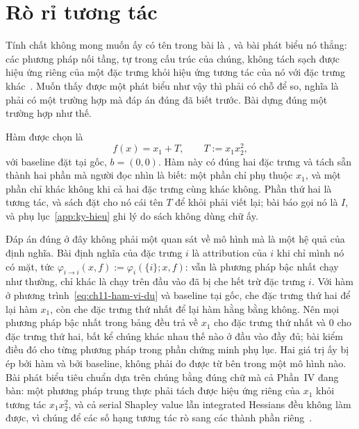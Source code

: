 \section{Rò rỉ tương tác}
\label{sec:ch11-ro-ri-tuong-tac}

%
Tính chất không mong muốn ấy có tên trong bài là
, và bài phát biểu nó thẳng: các
phương pháp nối tầng, tự trong cấu trúc của chúng, không tách sạch được hiệu
ứng riêng của một đặc trưng khỏi hiệu ứng tương tác của nó với đặc trưng
khác~\autocite{p23metagame}. Muốn thấy được một phát biểu như vậy thì phải có
chỗ để so, nghĩa là phải có một trường hợp mà đáp án đúng đã biết trước. Bài
dựng đúng một trường hợp như thế.

Hàm được chọn là
%
\begin{equation}
  \label{eq:ch11-ham-vi-du}
  f(x) = x_1 + T, \qquad T := x_1 x_2^2,
\end{equation}
%
với baseline đặt tại gốc, $b = (0,0)$. Hàm này có đúng hai đặc trưng và tách
sẵn thành hai phần mà người đọc nhìn là biết: một phần chỉ phụ thuộc $x_1$, và
một phần chỉ khác không khi cả hai đặc trưng cùng khác không. Phần thứ hai là
tương tác, và sách đặt cho nó cái tên $T$ để khỏi phải viết lại; bài báo gọi nó
là $I$, và phụ lục~\ref{app:ky-hieu} ghi lý do sách không dùng chữ ấy.

Đáp án đúng ở đây không phải một quan sát về mô hình mà là một hệ quả của định
nghĩa. Bài định nghĩa  của đặc trưng
$i$ là attribution của $i$ khi chỉ mình nó có mặt, tức
$\varphi_{i \to i}(x,f) := \varphi_i(\{i\}; x, f)$: vẫn là phương pháp bậc nhất
chạy như thường, chỉ khác là chạy trên đầu vào đã bị che hết trừ đặc trưng $i$.
Với hàm ở phương trình~\ref{eq:ch11-ham-vi-du} và baseline tại gốc, che đặc
trưng thứ hai để lại hàm $x_1$, còn che đặc trưng thứ nhất để lại hàm hằng
bằng không. Nên mọi phương pháp bậc nhất trong bảng đều trả về $x_1$ cho đặc
trưng thứ nhất và $0$ cho đặc trưng thứ hai, bất kể chúng khác nhau thế nào ở
đầu vào đầy đủ; bài kiểm điều đó cho từng phương pháp trong phần chứng minh
phụ lục. Hai giá trị ấy bị ép bởi hàm và bởi baseline, không phải đo được từ
bên trong một mô hình nào. Bài phát biểu tiêu chuẩn dựa trên
chúng bằng đúng chữ mà cả Phần~IV đang bàn: một phương pháp trung thực phải
tách được hiệu ứng riêng của $x_1$ khỏi tương tác $x_1 x_2^2$, và cả serial
Shapley value lẫn integrated Hessians đều không làm được, vì chúng để các số
hạng tương tác rò sang các thành phần riêng~\autocite{p23metagame}.

